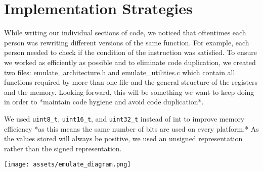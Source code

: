 \documentclass[11pt]{article}
\begin{document}
\section{Implementation Strategies}

While writing our individual sections of code, we noticed that oftentimes each person was rewriting different versions of the same function. For example, each person needed to check if the condition of the instruction was satisfied. To ensure we worked as efficiently as possible and to eliminate code duplication, we created two files: emulate\_architecture.h and emulate\_utilities.c which contain all functions required by more than one file and the general structure of the registers and the memory. Looking forward, this will be something we want to keep doing in order to *maintain code hygiene and avoid code duplication*.

We used \texttt{uint8\_t}, \texttt{uint16\_t}, and \texttt{uint32\_t} instead of int to improve memory efficiency *as this means the same number of bits are used on every platform.* As the values stored will always be positive, we used an unsigned representation rather than the signed representation.

\begin{center}
    \texttt{[image: assets/emulate\_diagram.png]}
\end{center}
\end{document}
